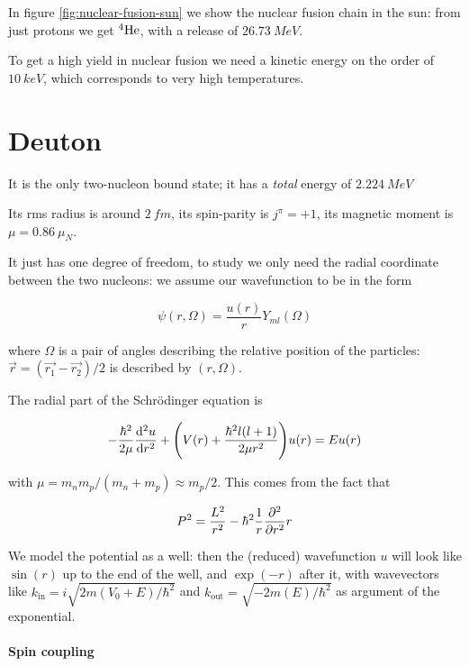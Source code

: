 \documentclass{article}
\begin{document}
In figure \ref{fig:nuclear-fusion-sun} we show the nuclear fusion chain in the sun: from just protons we get \(^{4} \ce{He} \), with a release of \(\SI{26.73}{MeV} \).

To get a high yield in nuclear fusion we need a kinetic energy on the order of \(\SI{10}{keV} \), which corresponds to very high temperatures.

\section{Deuton}

It is the only two-nucleon bound state; it has a \emph{total}  energy of \(\SI{2.224}{MeV} \)

Its rms radius is around \(\SI{2}{fm} \), its spin-parity is \(j^\pi = +1\), its magnetic moment is \(\mu = \SI{0.86}{} \mu_N \).

It just has one degree of freedom, to study we only need the radial coordinate between the two nucleons: we assume our wavefunction to be in the form

\begin{equation}
    \psi(r, \Omega) = \frac{u(r)}{r} Y_{ml} (\Omega)
\end{equation}

where \(\Omega\) is a pair of angles describing the relative position of the particles: \(\vec{r} = (\vec{r_1} - \vec{r_2})/2 \) is described by \((r, \Omega)\).

The radial part of the Schrödinger equation is

\begin{equation} \label{eq:deuton-radial-shroed}
    -\frac{\hbar^2}{2\mu} \dv[2]{u}{r}  + \qty(
    V(r) + \frac{\hbar^2 l (l+1)}{2 \mu r^2}
    ) u(r) = E u(r)
\end{equation}

with \(\mu = m_n m_p / (m_n + m_p) \approx m_p /2\). This comes from the fact that

\begin{equation}
    P^2 = \frac{L^2}{r^2} - \hbar^2 \frac{1}{r} \pdv[2]{}{r}r
\end{equation}

We model the potential as a well: then the (reduced) wavefunction \(u\) will look like \(\sin(r) \) up to the end of the well, and \(\exp(-r) \) after it, with wavevectors like \(k_{\text{in}} = i \sqrt{2m(V_0 + E) /\hbar^2} \) and \(k_{\text{out}} = \sqrt{-2m(E)/\hbar^2} \) as argument of the exponential.

\paragraph{Spin coupling}
\end{document}
